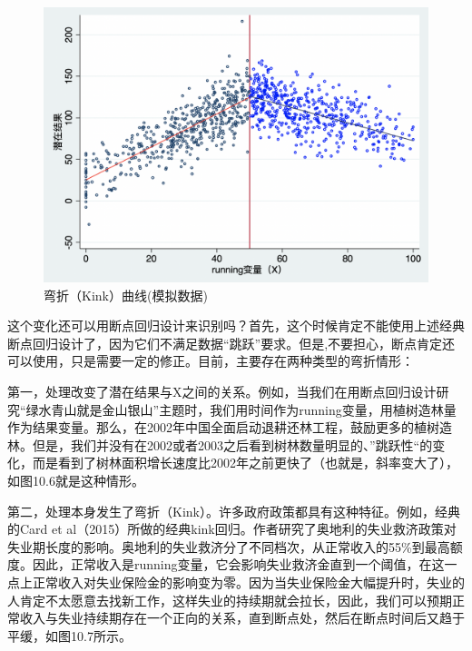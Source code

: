\documentclass[cn,12pt,math=newtx,citestyle=gb7714-2015,bibstyle=gb7714-2015]{elegantbook}
\begin{document}
	\begin{figure}[tbph]
		\centering
		\includegraphics[width=1\linewidth]{kink}
		\caption{弯折（Kink）曲线(模拟数据)}
		\label{fig:kink}
	\end{figure}
	
		这个变化还可以用断点回归设计来识别吗？首先，这个时候肯定不能使用上述经典断点回归设计了，因为它们不满足数据“跳跃”要求。但是,不要担心，断点肯定还可以使用，只是需要一定的修正。目前，主要存在两种类型的弯折情形：
		
	    第一，处理改变了潜在结果与X之间的关系。例如，当我们在用断点回归设计研究“绿水青山就是金山银山”主题时，我们用时间作为running变量，用植树造林量作为结果变量。那么，在2002年中国全面启动退耕还林工程，鼓励更多的植树造林。但是，我们并没有在2002或者2003之后看到树林数量明显的、”跳跃性“的变化，而是看到了树林面积增长速度比2002年之前更快了（也就是，斜率变大了），如图10.6就是这种情形。
	    
	    第二，处理本身发生了弯折（Kink）。许多政府政策都具有这种特征。例如，经典的Card et al（2015）所做的经典kink回归。作者研究了奥地利的失业救济政策对失业期长度的影响。奥地利的失业救济分了不同档次，从正常收入的55\%到最高额度。因此，正常收入是running变量，它会影响失业救济金直到一个阈值，在这一点上正常收入对失业保险金的影响变为零。因为当失业保险金大幅提升时，失业的人肯定不太愿意去找新工作，这样失业的持续期就会拉长，因此，我们可以预期正常收入与失业持续期存在一个正向的关系，直到断点处，然后在断点时间后又趋于平缓，如图10.7所示。
		
\end{document}

